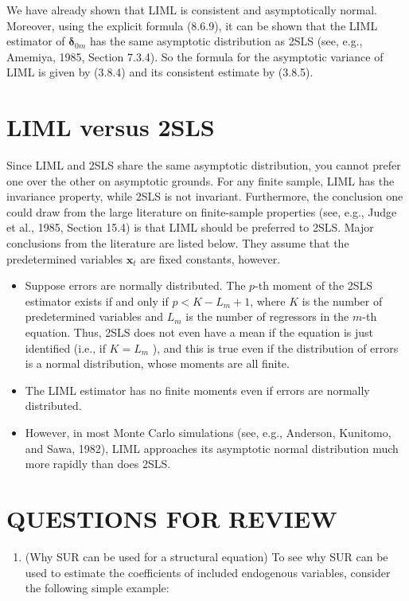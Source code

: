 \documentclass[10pt]{article}
\begin{document}
We have already shown that LIML is consistent and asymptotically normal. Moreover, using the explicit formula (8.6.9), it can be shown that the LIML estimator of $\boldsymbol{\delta}_{0 m}$ has the same asymptotic distribution as 2SLS (see, e.g., Amemiya, 1985, Section 7.3.4). So the formula for the asymptotic variance of LIML is given by (3.8.4) and its consistent estimate by (3.8.5).

\section*{LIML versus 2SLS}
Since LIML and 2SLS share the same asymptotic distribution, you cannot prefer one over the other on asymptotic grounds. For any finite sample, LIML has the invariance property, while 2SLS is not invariant. Furthermore, the conclusion one could draw from the large literature on finite-sample properties (see, e.g., Judge et al., 1985, Section 15.4) is that LIML should be preferred to 2SLS. Major conclusions from the literature are listed below. They assume that the predetermined variables $\mathbf{x}_{t}$ are fixed constants, however.

\begin{itemize}
  \item Suppose errors are normally distributed. The $p$-th moment of the 2SLS estimator exists if and only if $p<K-L_{m}+1$, where $K$ is the number of predetermined variables and $L_{m}$ is the number of regressors in the $m$-th equation. Thus, 2SLS does not even have a mean if the equation is just identified (i.e., if $K=L_{m}$ ), and this is true even if the distribution of errors is a normal distribution, whose moments are all finite.
  \item The LIML estimator has no finite moments even if errors are normally distributed.
  \item However, in most Monte Carlo simulations (see, e.g., Anderson, Kunitomo, and Sawa, 1982), LIML approaches its asymptotic normal distribution much more rapidly than does 2SLS.
\end{itemize}

\section*{QUESTIONS FOR REVIEW}
\begin{enumerate}
  \item (Why SUR can be used for a structural equation) To see why SUR can be used to estimate the coefficients of included endogenous variables, consider the following simple example:
\end{enumerate}
\end{document}
